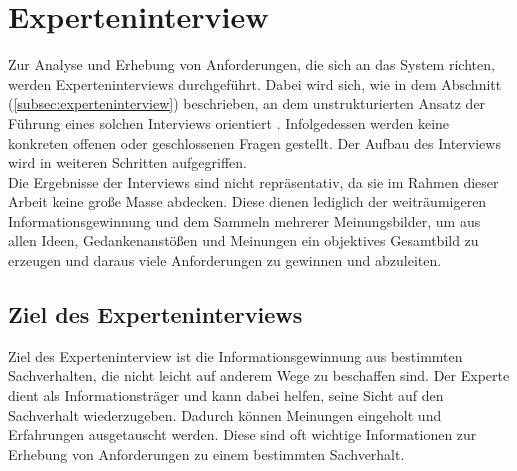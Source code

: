 \section{Experteninterview}
\label{sec:experteninterviewReqirements}
    Zur Analyse und Erhebung von Anforderungen, die sich an das System richten, werden Experteninterviews durchgeführt. 
    Dabei wird sich, wie in dem Abschnitt (\ref{subsec:experteninterview}) beschrieben, an dem unstrukturierten Ansatz der 
    Führung eines solchen Interviews orientiert \cite{robson2002real}. Infolgedessen werden keine konkreten offenen oder 
    geschlossenen Fragen gestellt. Der Aufbau des Interviews wird in weiteren Schritten aufgegriffen. 
    \\
    Die Ergebnisse der Interviews sind nicht repräsentativ, da sie im Rahmen dieser Arbeit keine große Masse abdecken. Diese 
    dienen lediglich der weiträumigeren Informationsgewinnung und dem Sammeln mehrerer Meinungsbilder, um aus allen 
    Ideen, Gedankenanstößen und Meinungen ein objektives Gesamtbild zu erzeugen und daraus viele Anforderungen zu gewinnen 
    und abzuleiten. 
\subsection{Ziel des Experteninterviews}
    Ziel des Experteninterview ist die Informationsgewinnung aus bestimmten Sachverhalten, die nicht leicht auf anderem Wege 
    zu beschaffen sind. Der Experte dient als Informationsträger und kann dabei helfen, seine Sicht auf den Sachverhalt 
    wiederzugeben. Dadurch können Meinungen eingeholt und Erfahrungen ausgetauscht werden. Diese sind oft wichtige 
    Informationen zur Erhebung von Anforderungen zu einem bestimmten Sachverhalt. %

